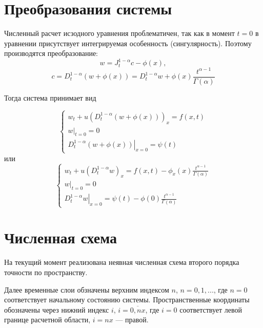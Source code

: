 \section{Преобразования системы}
Численный расчет исзодного уравнения проблематичен, так как в момент $t=0$ в уравнении присутствует интегрируемая особенность (сингулярность). Поэтому производятся преобразование:
\begin{equation}
	w = J^{1-\alpha}_t c - \phi(x),
\end{equation}
\begin{equation}
	c = D^{1-\alpha}_t \left( w + \phi(x) \right)
	= D^{1-\alpha}_t w + \phi(x) \frac{t^{\alpha - 1}}{\Gamma(\alpha)}
\end{equation}


Тогда система принимает вид

\begin{equation}
	\begin{cases}
		w_t + u \left( D^{1-\alpha}_t \left( w + \phi\left(x\right) \right) \right)_x = f(x,t)\\
		\left.w\right|_{t=0} = 0\\
		\left.D^{1-\alpha}_t \left( w + \phi(x) \right) \right|_{x=0} = \psi(t)
	\end{cases}
\end{equation}
или
\begin{equation}
	\label{eq:num1}
	\begin{cases}
		w_t + u \left( D^{1-\alpha}_t w\right)_x
		= f(x,t) - \phi_x\left(x\right)\frac{t^{\alpha - 1}}{\Gamma(\alpha)}\\
		\left.w\right|_{t=0} = 0\\
		\left.D^{1-\alpha}_t w \right|_{x=0}
		= \psi(t) - \phi(0) \frac{t^{\alpha - 1}}{\Gamma(\alpha)}
	\end{cases}
\end{equation}

\section{Численная схема}
На текущий момент реализована неявная численная схема второго порядка точности по пространству.

Далее временные слои обзначены верхним индексом $n$, $n=0,1,...$, где $n=0$ соответствует начальному состоянию системы. Пространственные координаты обозначены через нижний индекс $i$, $i=\overline{0,nx}$, где $i=0$ соответствует левой границе расчетной области, $i=nx$ --- правой.

